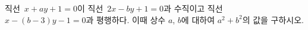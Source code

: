 직선~$x+ay+1=0$이 직선~$2x-by+1=0$과 수직이고 직선~$x-(b-3)y-1=0$과 평행하다. 이때 상수 $a$, $b$에 대하여 $a^2+b^2$의 값을 구하시오.

